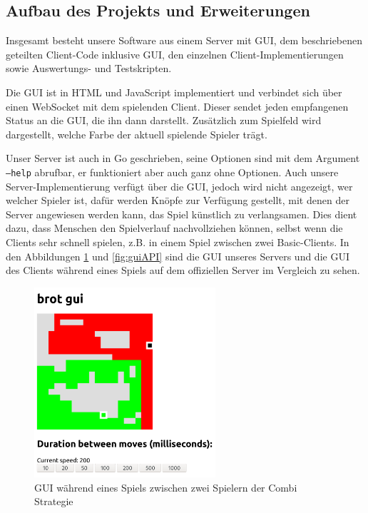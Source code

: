 \documentclass[12pt,a4paper]{article}
\begin{document}
\subsection{Aufbau des Projekts und Erweiterungen}
Insgesamt besteht unsere Software aus einem Server mit GUI, dem beschriebenen geteilten Client-Code inklusive GUI, den einzelnen Client-Implementierungen sowie Auswertungs- und Testskripten.

Die GUI ist in HTML und JavaScript implementiert und verbindet sich über einen WebSocket mit dem spielenden Client. Dieser sendet jeden empfangenen Status an die GUI, die ihn dann darstellt. Zusätzlich zum Spielfeld wird dargestellt, welche Farbe der aktuell spielende Spieler trägt.



Unser Server ist auch in Go geschrieben, seine Optionen sind mit dem Argument \texttt{--help} abrufbar, er funktioniert aber auch ganz ohne Optionen. Auch unsere Server-Im\-ple\-men\-tie\-rung verfügt über die GUI, jedoch wird nicht angezeigt, wer welcher Spieler ist, dafür werden Knöpfe zur Verfügung gestellt, mit denen der Server angewiesen werden kann, das Spiel künstlich zu verlangsamen. Dies dient dazu, dass Menschen den Spielverlauf nachvollziehen können, selbst wenn die Clients sehr schnell spielen, z.B. in einem Spiel zwischen zwei Basic-Clients. In den Abbildungen \ref{fig:gui} und \ref{fig:guiAPI} sind die GUI unseres Servers und die GUI des Clients während eines Spiels auf dem offiziellen Server im Vergleich zu sehen.

\begin{figure}
    \centering
    \includegraphics[width=0.6\textwidth]{gui.png}
    \caption{GUI während eines Spiels zwischen zwei Spielern der Combi Strategie}
    \label{fig:gui}
\end{figure}
\end{document}
